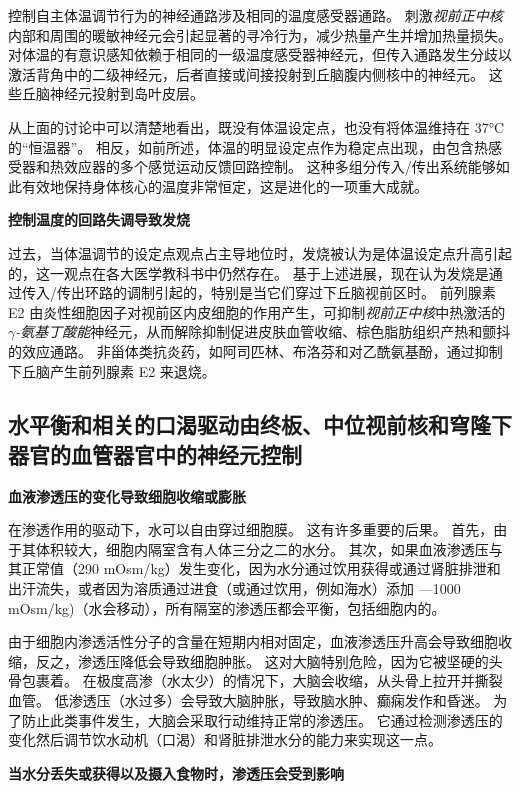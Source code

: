 控制自主体温调节行为的神经通路涉及相同的温度感受器通路。
刺激\textit{视前正中核}内部和周围的暖敏神经元会引起显著的寻冷行为，减少热量产生并增加热量损失。
对体温的有意识感知依赖于相同的一级温度感受器神经元，但传入通路发生分歧以激活背角中的二级神经元，后者直接或间接投射到丘脑腹内侧核中的神经元。
这些丘脑神经元投射到岛叶皮层。


从上面的讨论中可以清楚地看出，既没有体温设定点，也没有将体温维持在 37°C 的“恒温器”。
相反，如前所述，体温的明显设定点作为稳定点出现，由包含热感受器和热效应器的多个感觉运动反馈回路控制。
这种多组分传入/传出系统能够如此有效地保持身体核心的温度非常恒定，这是进化的一项重大成就。


\textbf{控制温度的回路失调导致发烧}

过去，当体温调节的设定点观点占主导地位时，发烧被认为是体温设定点升高引起的，这一观点在各大医学教科书中仍然存在。
基于上述进展，现在认为发烧是通过传入/传出环路的调制引起的，特别是当它们穿过下丘脑视前区时。
前列腺素 E2 由炎性细胞因子对视前区内皮细胞的作用产生，可抑制\textit{视前正中核}中热激活的\textit{$\gamma$-氨基丁酸能}神经元，从而解除抑制促进皮肤血管收缩、棕色脂肪组织产热和颤抖的效应通路。
非甾体类抗炎药，如阿司匹林、布洛芬和对乙酰氨基酚，通过抑制下丘脑产生前列腺素 E2 来退烧。



\subsection{水平衡和相关的口渴驱动由终板、中位视前核和穹隆下器官的血管器官中的神经元控制}

\textbf{血液渗透压的变化导致细胞收缩或膨胀}

在渗透作用的驱动下，水可以自由穿过细胞膜。
这有许多重要的后果。
首先，由于其体积较大，细胞内隔室含有人体三分之二的水分。
其次，如果血液渗透压与其正常值（290 mOsm/kg）发生变化，因为水分通过饮用获得或通过肾脏排泄和出汗流失，或者因为溶质通过进食（或通过饮用，例如海水）添加 —1000 mOsm/kg)（水会移动），所有隔室的渗透压都会平衡，包括细胞内的。


由于细胞内渗透活性分子的含量在短期内相对固定，血液渗透压升高会导致细胞收缩，反之，渗透压降低会导致细胞肿胀。
这对大脑特别危险，因为它被坚硬的头骨包裹着。
在极度高渗（水太少）的情况下，大脑会收缩，从头骨上拉开并撕裂血管。
低渗透压（水过多）会导致大脑肿胀，导致脑水肿、癫痫发作和昏迷。
为了防止此类事件发生，大脑会采取行动维持正常的渗透压。
它通过检测渗透压的变化然后调节饮水动机（口渴）和肾脏排泄水分的能力来实现这一点。


\textbf{当水分丢失或获得以及摄入食物时，渗透压会受到影响}

